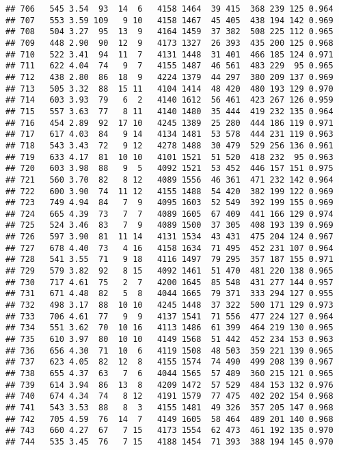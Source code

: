 \documentclass[]{article}
\begin{document}
\begin{verbatim}
## 706   545 3.54  93  14  6   4158 1464  39 415  368 239 125 0.964
## 707   553 3.59 109   9 10   4158 1467  45 405  438 194 142 0.969
## 708   504 3.27  95  13  9   4164 1459  37 382  508 225 112 0.965
## 709   448 2.90  90  12  9   4173 1327  26 393  435 200 125 0.968
## 710   522 3.41  94  11  7   4131 1448  31 401  466 185 124 0.971
## 711   622 4.04  74   9  7   4155 1487  46 561  483 229  95 0.965
## 712   438 2.80  86  18  9   4224 1379  44 297  380 209 137 0.969
## 713   505 3.32  88  15 11   4104 1414  48 420  480 193 129 0.970
## 714   603 3.93  79   6  2   4140 1612  56 461  423 267 126 0.959
## 715   557 3.63  77   8 11   4140 1480  35 444  419 232 135 0.964
## 716   454 2.89  92  17 10   4245 1389  25 280  444 186 119 0.971
## 717   617 4.03  84   9 14   4134 1481  53 578  444 231 119 0.963
## 718   543 3.43  72   9 12   4278 1488  30 479  529 256 136 0.961
## 719   633 4.17  81  10 10   4101 1521  51 520  418 232  95 0.963
## 720   603 3.98  88   9  5   4092 1521  53 452  446 157 151 0.975
## 721   560 3.70  82   8 12   4089 1556  46 361  471 232 142 0.964
## 722   600 3.90  74  11 12   4155 1488  54 420  382 199 122 0.969
## 723   749 4.94  84   7  9   4095 1603  52 549  392 199 155 0.969
## 724   665 4.39  73   7  7   4089 1605  67 409  441 166 129 0.974
## 725   524 3.46  83   7  9   4089 1500  37 305  408 193 139 0.969
## 726   597 3.90  81  11 14   4131 1534  43 431  475 204 124 0.967
## 727   678 4.40  73   4 16   4158 1634  71 495  452 231 107 0.964
## 728   541 3.55  71   9 18   4116 1497  79 295  357 187 155 0.971
## 729   579 3.82  92   8 15   4092 1461  51 470  481 220 138 0.965
## 730   717 4.61  75   2  7   4200 1645  85 548  431 277 144 0.957
## 731   671 4.48  82   5  8   4044 1665  79 371  333 294 127 0.955
## 732   498 3.17  88  10 10   4245 1448  37 322  500 171 129 0.973
## 733   706 4.61  77   9  9   4137 1541  71 556  477 224 127 0.964
## 734   551 3.62  70  10 16   4113 1486  61 399  464 219 130 0.965
## 735   610 3.97  80  10 10   4149 1568  51 442  452 234 153 0.963
## 736   656 4.30  71  10  6   4119 1508  48 503  359 221 139 0.965
## 737   623 4.05  82  12  8   4155 1574  74 490  499 208 139 0.967
## 738   655 4.37  63   7  6   4044 1565  57 489  360 215 121 0.965
## 739   614 3.94  86  13  8   4209 1472  57 529  484 153 132 0.976
## 740   674 4.34  74   8 12   4191 1579  77 475  402 202 154 0.968
## 741   543 3.53  88   8  3   4155 1481  49 326  357 205 147 0.968
## 742   705 4.59  76  14  7   4149 1605  58 464  489 201 140 0.968
## 743   660 4.27  67   7 15   4173 1554  62 473  461 192 135 0.970
## 744   535 3.45  76   7 15   4188 1454  71 393  388 194 145 0.970

\end{verbatim}
\end{document}
